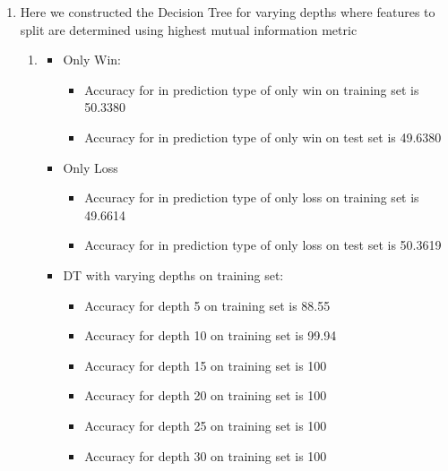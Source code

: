 \begin{enumerate}[label=(\alph*)]

    \item Here we constructed the Decision Tree for varying depths where features to split are determined using highest mutual information metric
          \begin{enumerate}[label=\roman*.]
              \item
                    \begin{itemize}
                        \item Only Win:
                              \begin{itemize}
                                  \item Accuracy for in prediction type of only win on training set is 50.3380
                                  \item Accuracy for in prediction type of only win on test set is 49.6380
                              \end{itemize}
                        \item Only Loss
                              \begin{itemize}
                                  \item Accuracy for in prediction type of only loss on training set is 49.6614
                                  \item Accuracy for in prediction type of only loss on test set is 50.3619
                              \end{itemize}
                        \item DT with varying depths on training set:
                              \begin{itemize}
                                  \item Accuracy for depth 5 on training set is 88.55
                                  \item Accuracy for depth 10 on training set is 99.94
                                  \item Accuracy for depth 15 on training set is 100
                                  \item Accuracy for depth 20 on training set is 100
                                  \item Accuracy for depth 25 on training set is 100
                                  \item Accuracy for depth 30 on training set is 100
                              \end{itemize}

\end{itemize}
\end{enumerate}
\end{enumerate}
